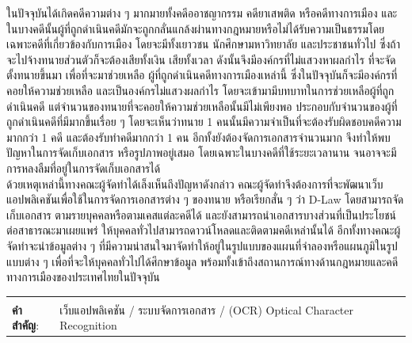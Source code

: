 \documentclass[12pt,oneside,openright,a4paper]{cpe-thai-project}
\begin{document}
\hspace*{1cm} ในปัจจุบันได้เกิดคดีความต่าง ๆ มากมายทั้งคดีออาชญากรรม คดียาเสพติด หรือคดีทางการเมือง และในบางคดีนั้นผู้ที่ถูกดำเนินคดีมักจะถูกกลั่นแกล้งผ่านทางกฎหมายหรือไม่ได้รับความเป็นธรรมโดยเฉพาะคดีที่เกี่ยวข้องกับการเมือง โดยจะมีทั้งเยาวชน นักศึกษามหาวิทยาลัย และประชาชนทั่วไป ซึ่งถ้าจะไปจ้างทนายส่วนตัวก็จะต้องเสียทั้งเงิน เสียทั้งเวลา ดังนั้นจึงมีองค์กรที่ไม่แสวงหาผลกำไร ที่จะจัดตั้งทนายขึ้นมา เพื่อที่จะมาช่วยเหลือ ผู้ที่ถูกดำเนินคดีทางการเมืองเหล่านี้ ซึ่งในปัจจุบันก็จะมีองค์กรที่คอยให้ความช่วยเหลือ และเป็นองค์กรไม่แสวงผลกำไร โดยจะเข้ามามีบทบาทในการช่วยเหลือผู้ที่ถูกดำเนินคดี แต่จำนวนของทนายที่จะคอยให้ความช่วยเหลือนั้นมีไม่เพียงพอ ประกอบกับจำนวนของผู้ที่ถูกดำเนินคดีที่มีมากขึ้นเรื่อย ๆ โดยจะเห็นว่าทนาย 1 คนนั้นมีความจำเป็นที่จะต้องรับผิดชอบคดีความมากกว่า 1 คดี และต้องรับทำคดีมากกว่า 1 คน อีกทั้งยังต้องจัดการเอกสารจำนวนมาก จึงทำให้พบปัญหาในการจัดเก็บเอกสาร หรือรูปภาพอยู่เสมอ โดยเฉพาะในบางคดีที่ใช้ระยะเวลานาน จนอาจจะมีการหลงลืมที่อยู่ในการจัดเก็บเอกสารได้ \\
\hspace*{1cm} ด้วยเหตุเหล่านี้ทางคณะผู้จัดทำได้เล็งเห็นถึงปัญหาดังกล่าว คณะผู้จัดทำจึงต้องการที่จะพัฒนาเว็บแอปพลิเคชันเพื่อใช้ในการจัดการเอกสารต่าง ๆ ของทนาย หรือเรียกสั่น ๆ ว่า D-Law โดยสามารถจัดเก็บเอกสาร ตามรายบุคคลหรือตามเคสแต่ละคดีได้ และยังสามารถนำเอกสารบางส่วนที่เป็นประโยชน์ต่อสาธารณะมาเผยแพร่ ให้บุคคลทั่วไปสามารถดาวน์โหลดและติดตามคดีเหล่านั้นได้ อีกทั้งทางคณะผู้จัดทำจะนำข้อมูลต่าง ๆ ที่มีความน่าสนใจมาจัดทำให้อยู่ในรูปแบบของแผนที่จำลองหรือแผนภูมิในรูปแบบต่าง ๆ เพื่อที่จะให้บุคคลทั่วไปได้ศึกษาข้อมูล พร้อมทั้งเข้าถึงสถานการณ์ทางด้านกฎหมายและคดีทางการเมืองของประเทศไทยในปัจจุบัน


\begin{flushleft}
\begin{tabular*}{\textwidth}{@{}lp{}}
 & \\

\textbf{คำสำคัญ}: & เว็บแอปพลิเคชัน / ระบบจัดการเอกสาร / (OCR) Optical Character Recognition
\end{tabular*}
\end{flushleft}
\endabstract

\end{document}

